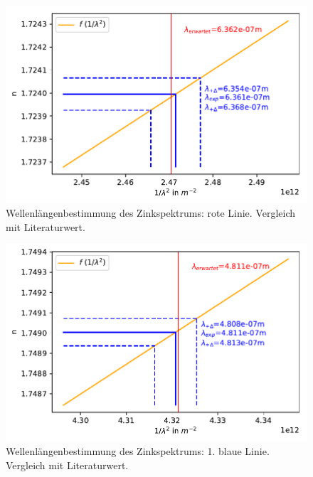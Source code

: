 \documentclass[12pt,a4paper]{article}
\begin{document}
{\begin{figure}
	\centering
	\includegraphics[scale=1]{Python/Zn_0.pdf}
	\caption{Wellenlängenbestimmung des Zinkspektrums: rote Linie. Vergleich mit Literaturwert.}
	\label{Zn_0}
\end{figure}

\begin{figure}
	\centering
	\includegraphics[scale=1]{Python/Zn_1.pdf}
	\caption{Wellenlängenbestimmung des Zinkspektrums: 1. blaue Linie. Vergleich mit Literaturwert.}
	\label{Zn_1}
\end{figure}

}
\end{document}
